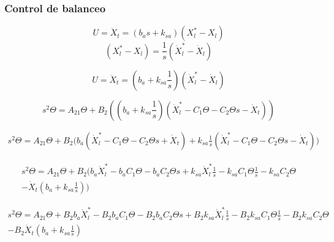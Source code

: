 \documentclass{article}
\begin{document}
        \subsubsection{Control de balanceo}
            \begin{equation}
                U=\ddot{X}_t= \left(b_a s+k_{sa}\right) \left(X_l^*- X_l\right)
            \end{equation}
            \begin{equation}
                \left(X_l^*- X_l\right)= \frac{1}{s}\left(\dot{X}_l^*- \dot{X}_l\right)
            \end{equation}

            \begin{equation}
                U=\ddot{X}_t= \left(b_a+k_{sa}\frac{1}{s}\right) \left(\dot{X}_l^*- \dot{X}_l\right)
            \end{equation}

            \begin{equation}
                s^2 \Theta = A_{21} \Theta + B_{2} \left( \left(b_a+k_{sa}\frac{1}{s}\right) \left(\dot{X}_l^*- C_1 \Theta-C_2 \Theta s - \dot{X}_t\right) \right)
            \end{equation}

            \begin{equation}
                \begin{split}
                s^2 \Theta = A_{21} \Theta + B_{2} \biggl(  b_a\left(\dot{X}_l^*- C_1 \Theta -C_2 \Theta s + \dot{X}_t\right) + k_{sa}\frac{1}{s}\left(\dot{X}_l^* -C_1 \Theta -C_2 \Theta s - \dot{X}_t\right)\biggr)
                \end{split}
            \end{equation}

            \begin{equation}
                \begin{split}
                s^2 \Theta = A_{21} \Theta + B_{2}\biggl(  b_a\dot{X}_l^*- b_a C_1 \Theta -b_a C_2 \Theta s + k_{sa}\dot{X}_l^*\frac{1}{s} - k_{sa} C_1 \Theta \frac{1}{s} - k_{sa} C_2 \Theta \\
                - \dot{X}_t\left(b_a+k_{sa}\frac{1}{s}\right)\biggr)
                \end{split}
            \end{equation}

            \begin{equation}
                \begin{split}
                s^2 \Theta = A_{21} \Theta + B_{2}b_a\dot{X}_l^*- B_{2}b_a C_1 \Theta -B_{2}b_a C_2 \Theta s + B_{2}k_{sa}\dot{X}_l^*\frac{1}{s} - B_{2}k_{sa} C_1 \Theta \frac{1}{s} - B_{2}k_{sa} C_2 \Theta \\
                - B_{2}\dot{X}_t\left(b_a+k_{sa}\frac{1}{s}\right)
                \end{split}
            \end{equation}
\end{document}
